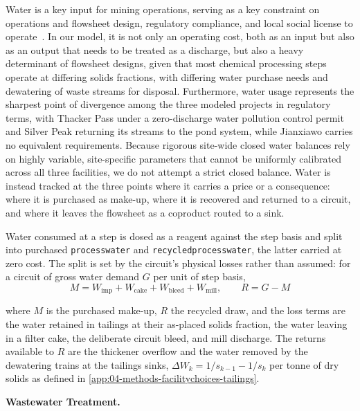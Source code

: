 \documentclass{article}
\renewcommand\_{\textunderscore\allowbreak}
\begin{document}
Water is a key input for mining operations, serving as a key constraint on operations and flowsheet design, regulatory compliance, and local social license to operate~\cite{schombergExtendedLifeCycle2021, riofrancosSecuritySustainabilityNexus2023}. In our model, it is not only an operating cost, both as an input but also as an output that needs to be treated as a discharge, but also a heavy determinant of flowsheet designs, given that most chemical processing steps operate at differing solids fractions, with differing water purchase needs and dewatering of waste streams for disposal. Furthermore, water usage represents the sharpest point of divergence among the three modeled projects in regulatory terms, with Thacker Pass under a zero-discharge water pollution control permit and Silver Peak returning its streams to the pond system, while Jianxiawo carries no equivalent requirements. Because rigorous site-wide closed water balances rely on highly variable, site-specific parameters that cannot be uniformly calibrated across all three facilities, we do not attempt a strict closed balance. Water is instead tracked at the three points where it carries a price or a consequence: where it is purchased as make-up, where it is recovered and returned to a circuit, and where it leaves the flowsheet as a coproduct routed to a sink. 

Water consumed at a step is dosed as a reagent against the step basis and split into purchased \texttt{process\_water} and \texttt{recycled\_process\_water}, the latter carried at zero cost. The split is set by the circuit's physical losses rather than assumed: for a circuit of gross water demand $G$ per unit of step basis,
\begin{equation}
    M = W_{\text{imp}} + W_{\text{cake}} + W_{\text{bleed}} + W_{\text{mill}}, \qquad R = G - M
\end{equation}

\noindent where $M$ is the purchased make-up, $R$ the recycled draw, and the loss terms are the water retained in tailings at their as-placed solids fraction, the water leaving in a filter cake, the deliberate circuit bleed, and mill discharge. The returns available to $R$ are the thickener overflow and the water removed by the dewatering trains at the tailings sinks, $\Delta W_k = 1/s_{k-1} - 1/s_k$ per tonne of dry solids as defined in \ref{app:04-methods-facilitychoices-tailings}.

\medskip
\noindent\textbf{Wastewater Treatment.}\quad
\end{document}
